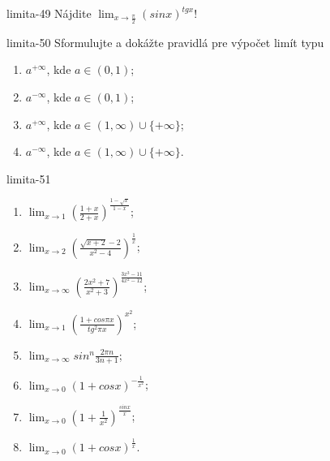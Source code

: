 \begin{defproblem}{limita-49}
Nájdite $\lim_{x \rightarrow \frac{\pi}{2}} (sin x)^{tg x}$!
\end{defproblem}

\begin{defproblem}{limita-50}
Sformulujte a dokážte pravidlá pre výpočet limít typu
\begin{multicols}{2}
\begin{enumerate}
    \item $a^{+\infty}$, kde $a \in (0,1)$;
    \item $a^{-\infty}$, kde $a \in (0,1)$;
    \item $a^{+\infty}$, kde $a \in (1,\infty) \cup \{+\infty \}$;
    \item $a^{-\infty}$, kde $a \in (1,\infty) \cup \{+\infty \}$.
\end{enumerate}
\end{multicols}
\end{defproblem}

\begin{defproblem}{limita-51}
\begin{multicols}{2}
\begin{enumerate}
    \item $\lim_{{x \rightarrow 1}} (\frac{1+x}{2+x})^{\frac{1-\sqrt{x}}{1-x}}$;
    \item $\lim_{{x \rightarrow 2}} (\frac{\sqrt{x+2}-2}{x^2-4})^{\frac{1}{x}}$;
    \item $\lim_{{x \rightarrow \infty}} (\frac{2x^2+7}{x^2+3})^{\frac{3x^3-11}{4x^2-12}}$;
    \item $\lim_{{x \rightarrow 1}} (\frac{1+cos \pi x}{tg ^2 \pi x})^{x^2}$;
    \item $\lim_{{x \rightarrow \infty}} sin ^n \frac{2 \pi n}{3n+1}$;
    \item $\lim_{{x \rightarrow 0}} (1+cos x)^{-\frac{1}{x^2}}$;
    \item $\lim_{{x \rightarrow 0}} (1+\frac{1}{x^2})^{\frac{sin x}{x}}$;
    \item $\lim_{{x \rightarrow 0}} (1+cos x)^{\frac{1}{x}}$.
\end{enumerate}
\end{multicols}
\end{defproblem}

